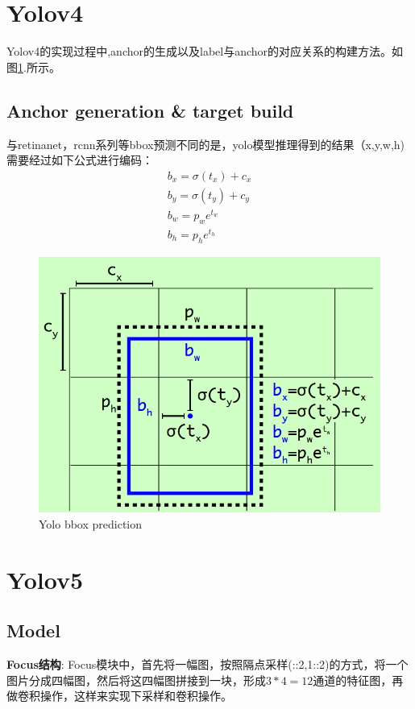 \documentclass{article}
\begin{document}
\section{Yolov4}
Yolov4的实现过程中,anchor的生成以及label与anchor的对应关系的构建方法。如图\ref{Fig.yolo_bbox}.所示。
\subsection{Anchor generation \& target build}
与retinanet，rcnn系列等bbox预测不同的是，yolo模型推理得到的结果（x,y,w,h)需要经过如下公式进行编码：
\begin{equation}
\begin{aligned}
b_x = \sigma(t_x)+c_x \\
b_y = \sigma(t_y)+c_y \\
b_w = p_we^{t_w} \\
b_h = p_he^{t_h}
\end{aligned}
\end{equation}
\begin{figure}[htp!]
\centering
\includegraphics[scale=0.3]{images/yolo_bbox.png}
\caption{Yolo bbox prediction}
\label{Fig.yolo_bbox}
\end{figure}

\section{Yolov5}
\subsection{Model}
\textbf{Focus结构}: Focus模块中，首先将一幅图，按照隔点采样(::2,1::2)的方式，将一个图片分成四幅图，然后将这四幅图拼接到一块，形成$3*4=12$通道的特征图，再做卷积操作，这样来实现下采样和卷积操作。
\end{document}

